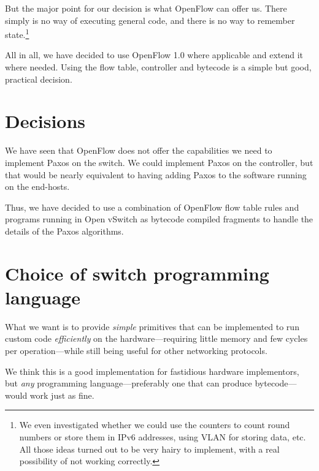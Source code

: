 But the major point for our decision is what OpenFlow can offer us.
There simply is no way of executing general code, and there is no way to
remember state.\footnote{We even investigated whether we could use the
counters to count round numbers or store them in IPv6 addresses, using VLAN
for storing data, etc.  All those ideas turned out to be very hairy to
implement, with a real possibility of not working correctly.}

All in all, we have decided to use OpenFlow 1.0 where applicable and extend
it where needed.  Using the flow table, controller and bytecode is a simple
but good, practical decision.

\section{Decisions}

We have seen that OpenFlow does not offer the capabilities we need to
implement Paxos on the switch.  We could implement Paxos on the controller,
but that would be nearly equivalent to having adding Paxos to the software
running on the end-hosts.

Thus, we have decided to use a combination of OpenFlow flow table rules and
programs running in Open vSwitch as bytecode compiled
fragments to handle the details of the Paxos algorithms.


\section{Choice of switch programming language}


What we want is to provide \textit{simple} primitives that can be
implemented to run custom code \textit{efficiently} on the
hardware---requiring little memory and few cycles per operation---while
still being useful for other networking protocols.

We think this is a good implementation for fastidious hardware implementors,
but \textit{any} programming language---preferably one that can produce
bytecode---would work just as fine.

